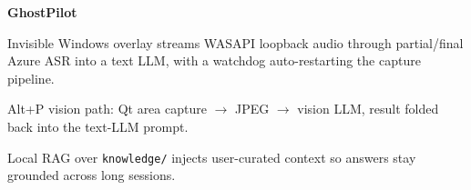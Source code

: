 \begin{twocolentry}{}
\textbf{GhostPilot}
\end{twocolentry}
\begin{onecolentry}
\begin{highlights}
\item Invisible Windows overlay streams WASAPI loopback audio through partial/final Azure ASR into a text LLM, with a watchdog auto-restarting the capture pipeline.
\item Alt+P vision path: Qt area capture $\rightarrow$ JPEG $\rightarrow$ vision LLM, result folded back into the text-LLM prompt.
\item Local RAG over \texttt{knowledge/} injects user-curated context so answers stay grounded across long sessions.
\end{highlights}
\end{onecolentry}
